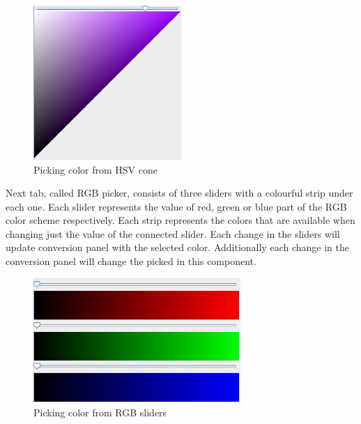\documentclass[titlepage]{article}
\begin{document}
\clearpage
\begin{figure}[!htb]
	\centering
	\includegraphics[width=0.5\textwidth]{img/hsvpick.png} 
	\caption{Picking color from HSV cone}
	\label{fig:hsv_pick}
\end{figure}

Next tab, called RGB picker, consists of three sliders with a colourful strip
under each one. Each slider represents the value of red, green or blue part of
the RGB color scheme respectively. Each strip represents the colors that are
available when changing just the value of the connected slider. Each change in
the sliders will update conversion panel with the selected color. Additionally
each change in the conversion panel will change the picked in this component.

\begin{figure}[!htb]
	\centering
	\includegraphics[width=0.7\textwidth]{img/rgbpick.png} 
	\caption{Picking color from RGB sliders}
	\label{fig:rgb_slider}
\end{figure}

\end{document}
